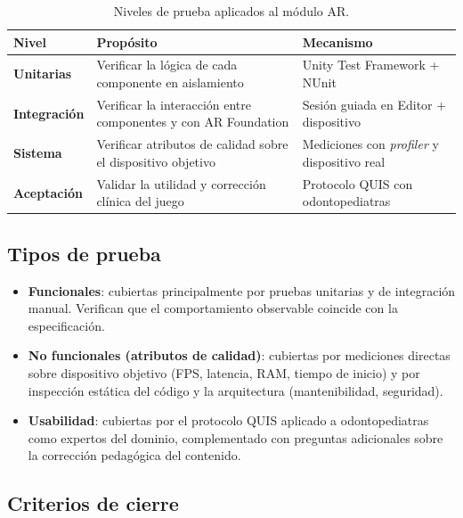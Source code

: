 \documentclass[12pt, a4paper]{article}
\begin{document}
\begin{table}[H]
  \centering
  \caption{Niveles de prueba aplicados al módulo AR.}
  \renewcommand{\arraystretch}{1.3}
  \begin{tabular}{>{\bfseries}p{3.3cm} p{4.2cm} p{5cm}}
    \toprule
    Nivel & Propósito & Mecanismo \\
    \midrule
    Unitarias        & Verificar la lógica de cada componente en aislamiento &
                       Unity Test Framework + NUnit \\
    Integración      & Verificar la interacción entre componentes y con AR Foundation &
                       Sesión guiada en Editor + dispositivo \\
    Sistema          & Verificar atributos de calidad sobre el dispositivo
                       objetivo & Mediciones con \textit{profiler} y dispositivo real \\
    Aceptación       & Validar la utilidad y corrección clínica del juego &
                       Protocolo QUIS con odontopediatras \\
    \bottomrule
  \end{tabular}
\end{table}

\subsection{Tipos de prueba}

\begin{itemize}[leftmargin=1.5cm, itemsep=4pt]
  \item \textbf{Funcionales}: cubiertas principalmente por pruebas unitarias y
        de integración manual. Verifican que el comportamiento observable
        coincide con la especificación.
  \item \textbf{No funcionales (atributos de calidad)}: cubiertas por mediciones
        directas sobre dispositivo objetivo (FPS, latencia, RAM, tiempo de
        inicio) y por inspección estática del código y la arquitectura
        (mantenibilidad, seguridad).
  \item \textbf{Usabilidad}: cubiertas por el protocolo QUIS aplicado a
        odontopediatras como expertos del dominio, complementado con preguntas
        adicionales sobre la corrección pedagógica del contenido.
\end{itemize}

\subsection{Criterios de cierre}
\end{document}
